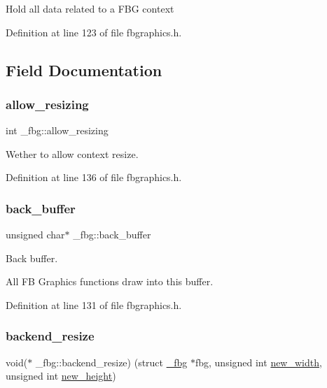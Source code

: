 Hold all data related to a F\+BG context 

Definition at line 123 of file fbgraphics.\+h.



\subsection{Field Documentation}
\mbox{\label{struct__fbg_ad7796d799a4ad67405101b8548d99ad8}} 
\subsubsection{\texorpdfstring{allow\+\_\+resizing}{allow\_resizing}}
{\footnotesize\ttfamily int \+\_\+fbg\+::allow\+\_\+resizing}



Wether to allow context resize. 



Definition at line 136 of file fbgraphics.\+h.

\mbox{\label{struct__fbg_a907e7fc97965b972c17114c885e53735}} 
\subsubsection{\texorpdfstring{back\+\_\+buffer}{back\_buffer}}
{\footnotesize\ttfamily unsigned char$\ast$ \+\_\+fbg\+::back\+\_\+buffer}



Back buffer. 

All FB Graphics functions draw into this buffer. 

Definition at line 131 of file fbgraphics.\+h.

\mbox{\label{struct__fbg_aef07a92ae059ea2a43653f4d0c5d928e}} 
\subsubsection{\texorpdfstring{backend\+\_\+resize}{backend\_resize}}
{\footnotesize\ttfamily void($\ast$ \+\_\+fbg\+::backend\+\_\+resize) (struct \hyperlink{struct__fbg}{\+\_\+fbg} $\ast$fbg, unsigned int \hyperlink{struct__fbg_a95859bd418a5cfff155cdb1421d295ef}{new\+\_\+width}, unsigned int \hyperlink{struct__fbg_a509aa5f8f0a94d8313bb4da777aa64bc}{new\+\_\+height})}



